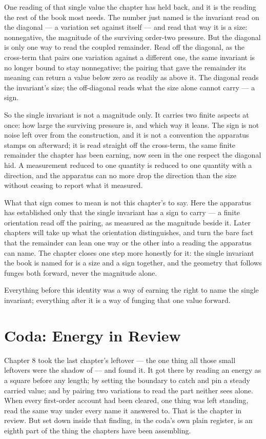 One reading of that single value the chapter has held back, and it is the reading the rest of the book most needs. The number just named is the invariant read on the diagonal --- a variation set against itself --- and read that way it is a size: nonnegative, the magnitude of the surviving order-two pressure. But the diagonal is only one way to read the coupled remainder. Read off the diagonal, as the cross-term that pairs one variation against a different one, the same invariant is no longer bound to stay nonnegative; the pairing that gave the remainder its meaning can return a value below zero as readily as above it. The diagonal reads the invariant's size; the off-diagonal reads what the size alone cannot carry --- a sign.

So the single invariant is not a magnitude only. It carries two finite aspects at once: how large the surviving pressure is, and which way it leans. The sign is not noise left over from the construction, and it is not a convention the apparatus stamps on afterward; it is read straight off the cross-term, the same finite remainder the chapter has been earning, now seen in the one respect the diagonal hid. A measurement reduced to one quantity is reduced to one quantity with a direction, and the apparatus can no more drop the direction than the size without ceasing to report what it measured.

What that sign comes to mean is not this chapter's to say. Here the apparatus has established only that the single invariant has a sign to carry --- a finite orientation read off the pairing, as measured as the magnitude beside it. Later chapters will take up what the orientation distinguishes, and turn the bare fact that the remainder can lean one way or the other into a reading the apparatus can name. The chapter closes one step more honestly for it: the single invariant the book is named for is a size and a sign together, and the geometry that follows funges both forward, never the magnitude alone.

Everything before this identity was a way of earning the right to name the
single invariant; everything after it is a way of funging that one value
forward.

\section*{Coda: Energy in Review}

Chapter 8 took the last chapter's leftover --- the one thing all those small leftovers were the shadow of --- and found it. It got there by reading an energy as a square before any length; by setting the boundary to catch and pin a steady carried value; and by pairing two variations to read the part neither sees alone. When every first-order account had been cleared, one thing was left standing, read the same way under every name it answered to. That is the chapter in review. But set down inside that finding, in the coda's own plain register, is an eighth part of the thing the chapters have been assembling.

